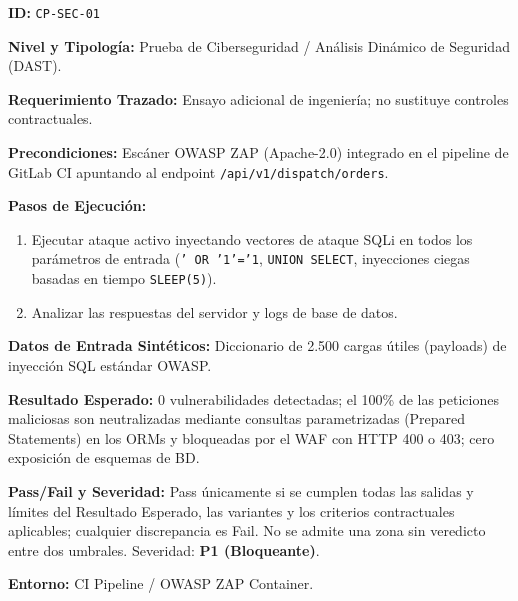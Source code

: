 \par\noindent\textbf{ID:} \texttt{C\allowbreak{}P\allowbreak{}-\allowbreak{}S\allowbreak{}E\allowbreak{}C\allowbreak{}-\allowbreak{}0\allowbreak{}1\allowbreak{}}\par
\par\noindent\textbf{Nivel y Tipología:} Prueba de Ciberseguridad / Análisis Dinámico de Seguridad (DAST).\par
\par\noindent\textbf{Requerimiento Trazado:} Ensayo adicional de ingeniería; no sustituye controles contractuales.\par
\par\noindent\textbf{Precondiciones:} Escáner OWASP ZAP (Apache-2.0) integrado en el pipeline de GitLab CI apuntando al endpoint \texttt{/\allowbreak{}a\allowbreak{}p\allowbreak{}i\allowbreak{}/\allowbreak{}v\allowbreak{}1\allowbreak{}/\allowbreak{}d\allowbreak{}i\allowbreak{}s\allowbreak{}p\allowbreak{}a\allowbreak{}t\allowbreak{}c\allowbreak{}h\allowbreak{}/\allowbreak{}o\allowbreak{}r\allowbreak{}d\allowbreak{}e\allowbreak{}r\allowbreak{}s\allowbreak{}}.\par
\par\noindent\textbf{Pasos de Ejecución:} \par
\begin{enumerate}
\item Ejecutar ataque activo inyectando vectores de ataque SQLi en todos los parámetros de entrada (\texttt{'\allowbreak{} O\allowbreak{}R\allowbreak{} '\allowbreak{}1\allowbreak{}'\allowbreak{}=\allowbreak{}'\allowbreak{}1\allowbreak{}}, \texttt{U\allowbreak{}N\allowbreak{}I\allowbreak{}O\allowbreak{}N\allowbreak{} S\allowbreak{}E\allowbreak{}L\allowbreak{}E\allowbreak{}C\allowbreak{}T\allowbreak{}}, inyecciones ciegas basadas en tiempo \texttt{S\allowbreak{}L\allowbreak{}E\allowbreak{}E\allowbreak{}P\allowbreak{}(\allowbreak{}5\allowbreak{})\allowbreak{}}).
\item Analizar las respuestas del servidor y logs de base de datos.
\end{enumerate}
\par\noindent\textbf{Datos de Entrada Sintéticos:} Diccionario de 2.500 cargas útiles (payloads) de inyección SQL estándar OWASP.\par
\par\noindent\textbf{Resultado Esperado:} 0 vulnerabilidades detectadas; el 100\% de las peticiones maliciosas son neutralizadas mediante consultas parametrizadas (Prepared Statements) en los ORMs y bloqueadas por el WAF con HTTP 400 o 403; cero exposición de esquemas de BD.\par
\par\noindent\textbf{Pass/Fail y Severidad:} Pass únicamente si se cumplen todas las salidas y límites del Resultado Esperado, las variantes y los criterios contractuales aplicables; cualquier discrepancia es Fail. No se admite una zona sin veredicto entre dos umbrales. Severidad: \textbf{P1 (Bloqueante)}.\par
\par\noindent\textbf{Entorno:} CI Pipeline / OWASP ZAP Container.\par






